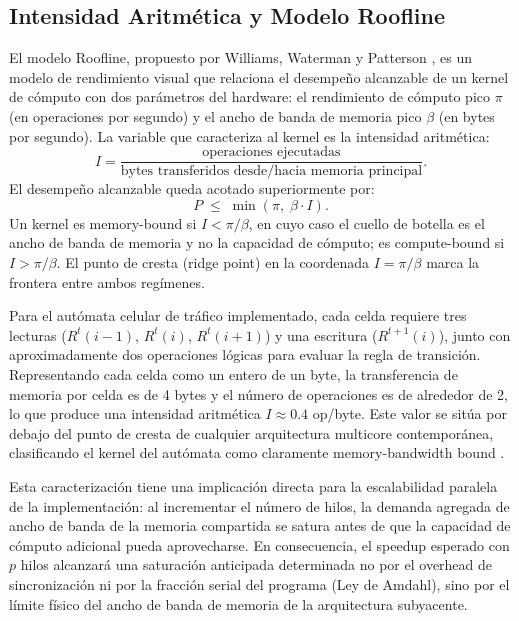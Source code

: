 \subsection{Intensidad Aritmética y Modelo Roofline}

El modelo Roofline, propuesto por Williams, Waterman y Patterson
\parencite{Williams2009}, es un modelo de rendimiento visual que
relaciona el desempeño alcanzable de un kernel de cómputo con dos
parámetros del hardware: el rendimiento de cómputo pico $\pi$ (en
operaciones por segundo) y el ancho de banda de memoria pico $\beta$
(en bytes por segundo). La variable que caracteriza al kernel es la
intensidad aritmética:
\[
  I = \frac{\text{operaciones ejecutadas}}{\text{bytes transferidos
  desde/hacia memoria principal}}.
\]
El desempeño alcanzable queda acotado superiormente por:
\[
  P \;\leq\; \min\!\left(\pi,\; \beta \cdot I\right).
\]
Un kernel es memory-bound si $I < \pi / \beta$, en cuyo caso el cuello
de botella es el ancho de banda de memoria y no la capacidad de cómputo;
es compute-bound si $I > \pi / \beta$. El punto de cresta (ridge point)
en la coordenada $I = \pi / \beta$ marca la frontera entre ambos
regímenes.

Para el autómata celular de tráfico implementado, cada celda requiere
tres lecturas ($R^t(i-1)$, $R^t(i)$, $R^t(i+1)$) y una escritura
($R^{t+1}(i)$), junto con aproximadamente dos operaciones lógicas para
evaluar la regla de transición. Representando cada celda como un entero
de un byte, la transferencia de memoria por celda es de 4 bytes y el
número de operaciones es de alrededor de 2, lo que produce una intensidad
aritmética $I \approx 0.4$ op/byte. Este valor se sitúa por debajo del
punto de cresta de cualquier arquitectura multicore contemporánea,
clasificando el kernel del autómata como claramente memory-bandwidth bound
\parencite{Williams2009}.

Esta caracterización tiene una implicación directa para la escalabilidad
paralela de la implementación: al incrementar el número de hilos, la
demanda agregada de ancho de banda de la memoria compartida se satura
antes de que la capacidad de cómputo adicional pueda aprovecharse. En
consecuencia, el speedup esperado con $p$ hilos alcanzará una saturación
anticipada determinada no por el overhead de sincronización ni por la
fracción serial del programa (Ley de Amdahl), sino por el límite físico
del ancho de banda de memoria de la arquitectura subyacente.